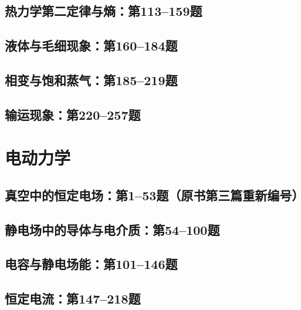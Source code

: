 \documentclass[lang=cn,color=blue,11pt]{elegantbook}
\begin{document}
\section{热力学第二定律与熵：第113--159题}





\section{液体与毛细现象：第160--184题}



\section{相变与饱和蒸气：第185--219题}




\section{输运现象：第220--257题}




\chapter{电动力学}
\section{真空中的恒定电场：第1--53题（原书第三篇重新编号）}




\section{静电场中的导体与电介质：第54--100题}




\section{电容与静电场能：第101--146题}





\section{恒定电流：第147--218题}

\end{document}

